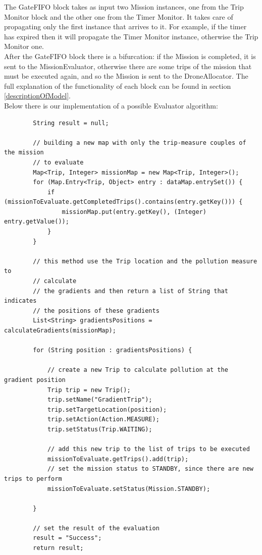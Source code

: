 The GateFIFO block takes as input two Mission instances, one from the Trip Monitor block and the other one from the Timer Monitor.
It takes care of propagating only the first instance that arrives to it.
For example, if the timer has expired then it will propagate the Timer Monitor instance, otherwise the Trip Monitor one.
\\

After the GateFIFO block there is a bifurcation:
if the Mission is completed, it is sent to the MissionEvaluator, otherwise there are some trips of the mission that must be executed again, and so the Mission is sent to the DroneAllocator.
The full explanation of the functionality of each block can be found in section \ref{descriptionOfModel}.
\\

Below there is our implementation of a possible Evaluator algorithm:
\\

\begin{lstlisting}
		String result = null;

		// building a new map with only the trip-measure couples of the mission
		// to evaluate
		Map<Trip, Integer> missionMap = new Map<Trip, Integer>();
		for (Map.Entry<Trip, Object> entry : dataMap.entrySet()) {
			if (missionToEvaluate.getCompletedTrips().contains(entry.getKey())) {
				missionMap.put(entry.getKey(), (Integer) entry.getValue());
			}
		}

		// this method use the Trip location and the pollution measure to
		// calculate
		// the gradients and then return a list of String that indicates
		// the positions of these gradients
		List<String> gradientsPositions = calculateGradients(missionMap);

		for (String position : gradientsPositions) {

			// create a new Trip to calculate pollution at the gradient position
			Trip trip = new Trip();
			trip.setName("GradientTrip");
			trip.setTargetLocation(position);
			trip.setAction(Action.MEASURE);
			trip.setStatus(Trip.WAITING);

			// add this new trip to the list of trips to be executed
			missionToEvaluate.getTrips().add(trip);
			// set the mission status to STANDBY, since there are new trips to perform
			missionToEvaluate.setStatus(Mission.STANDBY);
			
		}
			
		// set the result of the evaluation
		result = "Success";
		return result;
\end{lstlisting}


